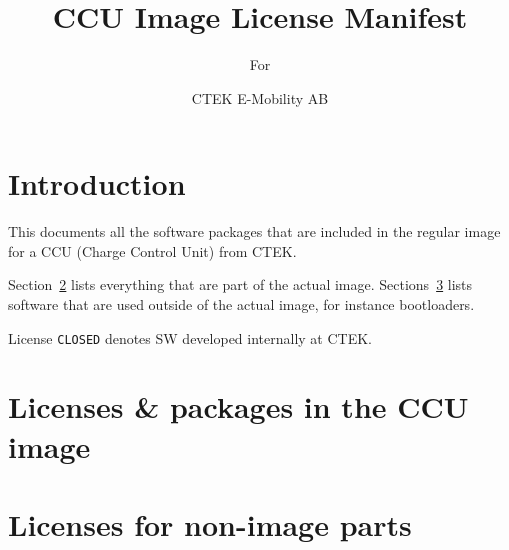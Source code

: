 \documentclass{scrartcl}
\title{CCU Image License Manifest}
\subtitle{For }
\author{CTEK E-Mobility AB}
\begin{document}
\maketitle

\section{Introduction}
\label{sec:introduction}

This documents all the software packages that are included in the regular
image for a CCU (Charge Control Unit) from CTEK.

Section~\ref{sec:lic-pack} lists everything that are part of the actual image.
Sections~\ref{sec:licenses-non-image} lists software that are used outside of
the actual image, for instance bootloaders.

License \lstinline{CLOSED} denotes SW developed internally at CTEK.

\section{Licenses \& packages in the CCU image}
\label{sec:lic-pack}



\section{Licenses for non-image parts}
\label{sec:licenses-non-image}


\end{document}
